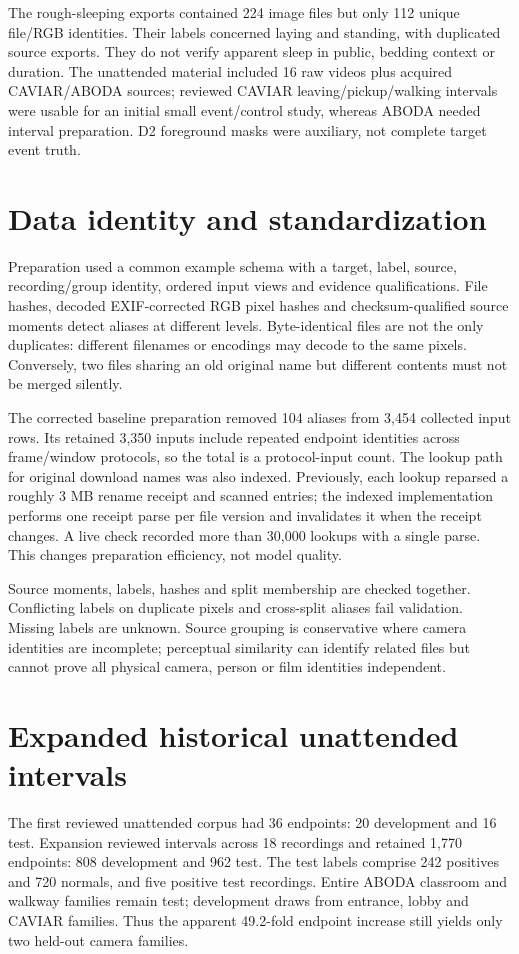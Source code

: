 The rough-sleeping exports contained 224 image files but only 112 unique file/RGB identities. Their labels concerned laying and standing, with duplicated source exports. They do not verify apparent sleep in public, bedding context or duration. The unattended material included 16 raw videos plus acquired CAVIAR/ABODA sources; reviewed CAVIAR leaving/pickup/walking intervals were usable for an initial small event/control study, whereas ABODA needed interval preparation. D2 foreground masks were auxiliary, not complete target event truth.

\section{Data identity and standardization}
Preparation used a common example schema with a target, label, source, recording/group identity, ordered input views and evidence qualifications. File hashes, decoded EXIF-corrected RGB pixel hashes and checksum-qualified source moments detect aliases at different levels. Byte-identical files are not the only duplicates: different filenames or encodings may decode to the same pixels. Conversely, two files sharing an old original name but different contents must not be merged silently.

The corrected baseline preparation removed 104 aliases from 3,454 collected input rows. Its retained 3,350 inputs include repeated endpoint identities across frame/window protocols, so the total is a protocol-input count. The lookup path for original download names was also indexed. Previously, each lookup reparsed a roughly 3 MB rename receipt and scanned entries; the indexed implementation performs one receipt parse per file version and invalidates it when the receipt changes. A live check recorded more than 30,000 lookups with a single parse. This changes preparation efficiency, not model quality.

Source moments, labels, hashes and split membership are checked together. Conflicting labels on duplicate pixels and cross-split aliases fail validation. Missing labels are unknown. Source grouping is conservative where camera identities are incomplete; perceptual similarity can identify related files but cannot prove all physical camera, person or film identities independent.

\section{Expanded historical unattended intervals}
The first reviewed unattended corpus had 36 endpoints: 20 development and 16 test. Expansion reviewed intervals across 18 recordings and retained 1,770 endpoints: 808 development and 962 test. The test labels comprise 242 positives and 720 normals, and five positive test recordings. Entire ABODA classroom and walkway families remain test; development draws from entrance, lobby and CAVIAR families. Thus the apparent 49.2-fold endpoint increase still yields only two held-out camera families.


